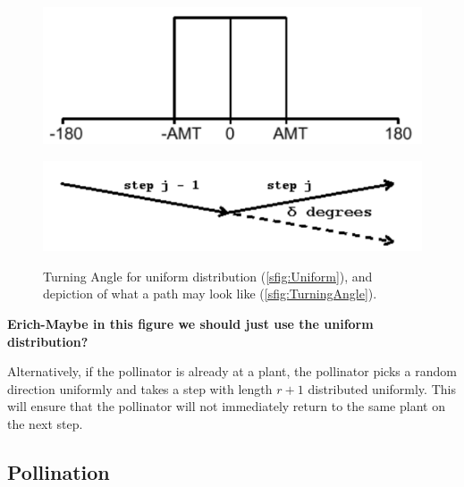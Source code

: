 \begin{figure}[h!]
  \begin{center}
  \begin{minipage}[b]{0.48\textwidth}
    \centering
    \includegraphics[scale=0.4]{Figures/UniformTADistribution.pdf}
     \label{sfig:Uniform}
  \end{minipage}
  \begin{minipage}[b]{0.48\textwidth}
    \centering
    \includegraphics[scale=0.5]{Figures/TurningAngle.pdf}
     \label{sfig:TurningAngle}
  \end{minipage}
  \end{center}
  \caption{Turning Angle for uniform distribution (\cref{sfig:Uniform}),
  and depiction of what a path may look like
  (\cref{sfig:TurningAngle}).}\label{fig:TurningAngle}
\end{figure}
{\bf Erich-Maybe in this figure we should just use the uniform distribution?}


Alternatively, if the pollinator is already at a plant, the pollinator picks a
random direction uniformly and takes a step with length $r+1$ distributed
uniformly.  This will ensure that the pollinator will not immediately return to
the same plant on the next step.

\subsection{Pollination}

